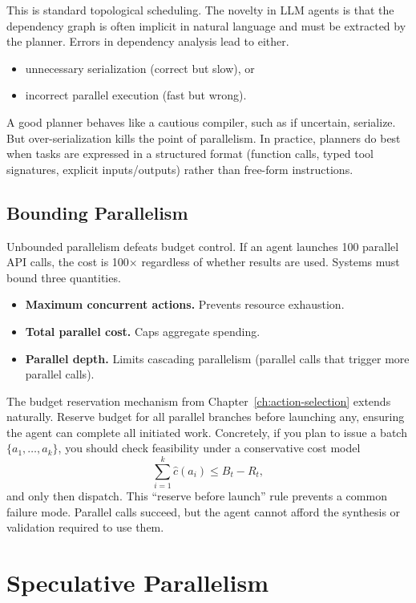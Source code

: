 This is standard topological scheduling. The novelty in LLM agents is that the dependency graph is often implicit in natural language and must be extracted by the planner. Errors in dependency analysis lead to either.
\begin{itemize}
\item unnecessary serialization (correct but slow), or
\item incorrect parallel execution (fast but wrong).
\end{itemize}

A good planner behaves like a cautious compiler, such as if uncertain, serialize. But over-serialization kills the point of parallelism. In practice, planners do best when tasks are expressed in a structured format (function calls, typed tool signatures, explicit inputs/outputs) rather than free-form instructions.

\subsection{Bounding Parallelism}

Unbounded parallelism defeats budget control. If an agent launches 100 parallel API calls, the cost is 100$\times$ regardless of whether results are used. Systems must bound three quantities.

\begin{itemize}
\item \textbf{Maximum concurrent actions.} Prevents resource exhaustion.
\item \textbf{Total parallel cost.} Caps aggregate spending.
\item \textbf{Parallel depth.} Limits cascading parallelism (parallel calls that trigger more parallel calls).
\end{itemize}

The budget reservation mechanism from Chapter~\ref{ch:action-selection} extends naturally. Reserve budget for all parallel branches before launching any, ensuring the agent can complete all initiated work. Concretely, if you plan to issue a batch $\{a_1,\dots,a_k\}$, you should check feasibility under a conservative cost model
\[
\sum_{i=1}^k \widehat{c}(a_i) \leq B_t - R_t,
\]
and only then dispatch. This ``reserve before launch'' rule prevents a common failure mode. Parallel calls succeed, but the agent cannot afford the synthesis or validation required to use them.
\section{Speculative Parallelism}

